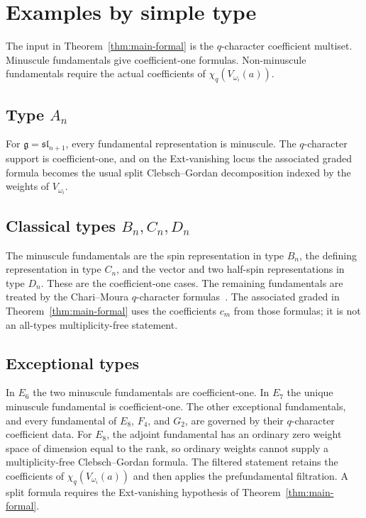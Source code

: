 \documentclass[11pt,reqno]{amsart}
\theoremstyle{definition}
\theoremstyle{remark}
\newcommand{\fg}{\mathfrak{g}}
\newcommand{\fsl}{\mathfrak{sl}}
\numberwithin{equation}{section}
\begin{document}
\section{Examples by simple type}\label{sec:examples}

The input in Theorem~\ref{thm:main-formal} is the
$q$-character coefficient multiset. Minuscule fundamentals give
coefficient-one formulas. Non-minuscule fundamentals require the
actual coefficients of $\chi_q(V_{\omega_i}(a))$.

\subsection{Type $A_n$}

For $\fg=\fsl_{n+1}$, every fundamental representation is
minuscule. The $q$-character support is coefficient-one, and on
the Ext-vanishing locus the associated graded formula becomes the
usual split Clebsch--Gordan decomposition indexed by the weights
of $V_{\omega_i}$.

\subsection{Classical types $B_n,C_n,D_n$}

The minuscule fundamentals are the spin representation in type
$B_n$, the defining representation in type $C_n$, and the vector
and two half-spin representations in type $D_n$. These are the
coefficient-one cases. The remaining fundamentals are treated by
the Chari--Moura $q$-character formulas~\cite{ChariMoura06}. The
associated graded in Theorem~\ref{thm:main-formal} uses the
coefficients $c_m$ from those formulas; it is not an all-types
multiplicity-free statement.

\subsection{Exceptional types}

In $E_6$ the two minuscule fundamentals are coefficient-one. In
$E_7$ the unique minuscule fundamental is coefficient-one. The
other exceptional fundamentals, and every fundamental of $E_8$,
$F_4$, and $G_2$, are governed by their $q$-character coefficient
data. For $E_8$, the adjoint fundamental has an ordinary zero
weight space of dimension equal to the rank, so ordinary weights
cannot supply a multiplicity-free Clebsch--Gordan formula. The
filtered statement retains the coefficients of
$\chi_q(V_{\omega_i}(a))$ and then applies the prefundamental
filtration. A split formula requires the Ext-vanishing hypothesis
of Theorem~\ref{thm:main-formal}.
\end{document}
